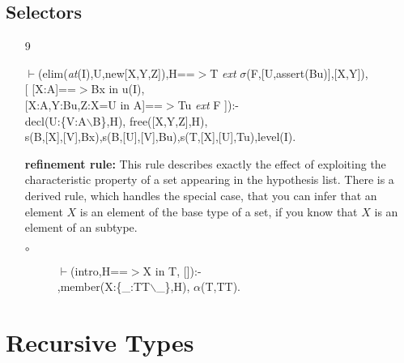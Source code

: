 \documentclass[11pt]{report}
\newcommand{\inv}[1]{\index{#1}}
\begin{document}
 \subsection{Selectors}
 \begin{enumerate}
 \item[9]
\begin{sf}\begin{tabbing}
$\vdash$(elim(\mbox{\it at}(I),U,new[X,Y,Z]),H==$>$T \mbox{\it ext} $\sigma$(F,[U,assert(Bu)],[X,Y]),\\[-0.15ex]
\hspace{2em}[ [X:A]==$>$Bx in u(I), \\[-0.15ex]
\hspace{3em}[X:A,Y:Bu,Z:X=U in A]==$>$Tu \mbox{\it ext} F ]):-\\[-0.15ex]
\hspace{2em}decl(U:\{V:A$\backslash$B\},H), free([X,Y,Z],H), \\[-0.15ex]
\hspace{2em}s(B,[X],[V],Bx),s(B,[U],[V],Bu),s(T,[X],[U],Tu),level(I).
\end{tabbing}\end{sf}

 {\bf refinement rule:}
 This rule describes exactly the effect of exploiting the 
 characteristic property of a set appearing in the hypothesis list.
 There is a derived rule, which handles the special case, that
 you can infer that an element $X$ is an element of the base
 type of a set, if you know that $X$ is an element of an subtype. 
 \begin{description}
 \item[$\circ$]
\begin{sf}\begin{tabbing}
$\vdash$(intro,H==$>$X in T, []):-\\[-0.15ex]
\hspace{2em}{\bf derived},member(X:\{\_\hspace{0.1em}:TT$\backslash$\_\hspace{0.1em}\},H), $\alpha$(T,TT).
\end{tabbing}\end{sf}

 \end{description}
 \end{enumerate}
  
  
 \section{Recursive Types}
 \inv{recursive type}
 
\end{document}
